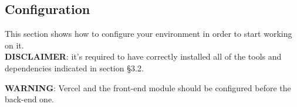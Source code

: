 \subsection{Configuration}
This section shows how to configure your environment in order to start working on it.\\
\textbf{DISCLAIMER}: it's required to have correctly installed all of the tools and dependencies indicated in section §3.2.

\textbf{WARNING}: Vercel and the front-end module should be configured before the back-end one.






